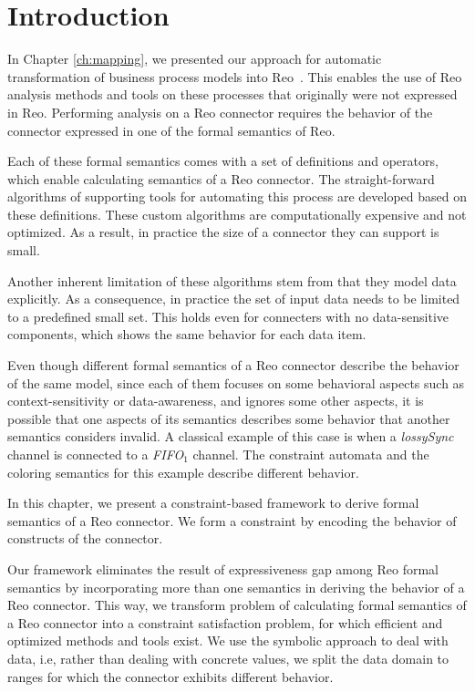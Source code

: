 \section{Introduction}
\label{sec:intro}
In Chapter \ref{ch:mapping}, we presented our approach for automatic transformation of business process models into Reo~\cite{behnaz}. This enables the use of Reo analysis methods and tools on these processes that originally were not expressed in Reo.
Performing analysis on a Reo connector requires the behavior of the connector expressed in one of the formal semantics of Reo. 

Each of these formal semantics comes with a set of definitions and operators, which enable calculating semantics of a Reo connector. The straight-forward algorithms of supporting tools for automating this process are developed based on these definitions. These custom algorithms are computationally expensive and not optimized. As a result, in practice the size of a connector they can support is small.  

Another inherent limitation of these algorithms stem from that they model data explicitly. As a consequence, in practice the set of input data needs to be limited to a predefined small set. This holds even for connecters with no data-sensitive components, which shows the same behavior for each data item.

Even though different formal semantics of a Reo connector describe the behavior of the same model, since each of them focuses on some behavioral aspects such as context-sensitivity or data-awareness, and ignores some other aspects, it is possible that one aspects of its semantics describes some behavior that another semantics considers invalid. 
A classical example of this case is when a \emph{lossySync} channel is connected to a \emph{FIFO}$_1$ channel. The constraint automata and the coloring semantics for this example describe different behavior. 

In this chapter, we present a constraint-based framework to derive formal semantics of a Reo connector. We form a constraint by encoding the behavior of constructs of the connector. 

Our framework eliminates the result of expressiveness gap among Reo formal semantics by incorporating more than one semantics in deriving the behavior of a Reo connector. 
This way, we transform problem of calculating formal semantics of a Reo connector into a constraint satisfaction problem, for which efficient and optimized methods and tools exist. We use the symbolic approach to deal with data, i.e, rather than dealing with concrete values, we split the data domain to ranges for which the connector exhibits different behavior. 

